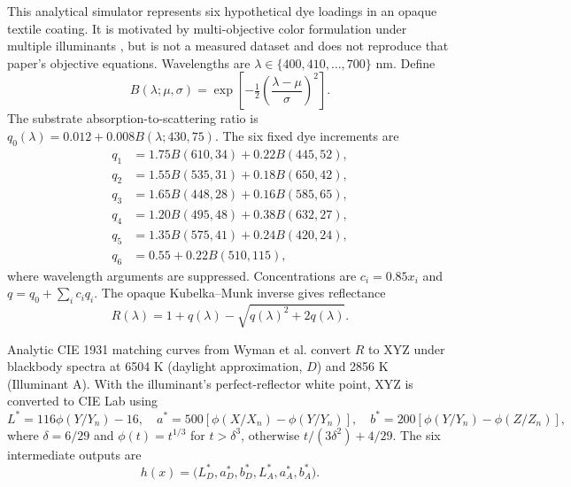 \documentclass{article}
\begin{document}
This analytical simulator represents six hypothetical dye loadings in an
opaque textile coating.  It is motivated by multi-objective color formulation
under multiple illuminants \cite{chaoucha2022color}, but is not a measured
dataset and does not reproduce that paper's objective equations.  Wavelengths
are $\lambda\in\{400,410,\ldots,700\}$ nm.  Define
\begin{equation}
 B(\lambda;\mu,\sigma)=
 \exp\!\left[-\tfrac12\left(\frac{\lambda-\mu}{\sigma}\right)^2\right].
\end{equation}
The substrate absorption-to-scattering ratio is
$q_0(\lambda)=0.012+0.008B(\lambda;430,75)$.  The six fixed dye increments are
\begin{equation}
\begin{aligned}
q_1 &= 1.75B(610,34)+0.22B(445,52),\\
q_2 &= 1.55B(535,31)+0.18B(650,42),\\
q_3 &= 1.65B(448,28)+0.16B(585,65),\\
q_4 &= 1.20B(495,48)+0.38B(632,27),\\
q_5 &= 1.35B(575,41)+0.24B(420,24),\\
q_6 &= 0.55+0.22B(510,115),
\end{aligned}
\end{equation}
where wavelength arguments are suppressed.  Concentrations are
$c_i=0.85x_i$ and $q=q_0+\sum_i c_iq_i$.  The opaque Kubelka--Munk inverse
\cite{kubelka1931optik} gives reflectance
\begin{equation}
  R(\lambda)=1+q(\lambda)-\sqrt{q(\lambda)^2+2q(\lambda)}.
  \label{eq:km}
\end{equation}

Analytic CIE 1931 matching curves from Wyman et al.
\cite{wyman2013simple} convert $R$ to XYZ under blackbody spectra at 6504 K
(daylight approximation, $D$) and 2856 K (Illuminant A).  With the illuminant's
perfect-reflector white point, XYZ is converted to CIE Lab using
\begin{equation}
 L^*=116\phi(Y/Y_n)-16,\quad
 a^*=500[\phi(X/X_n)-\phi(Y/Y_n)],\quad
 b^*=200[\phi(Y/Y_n)-\phi(Z/Z_n)],
\end{equation}
where $\delta=6/29$ and
$\phi(t)=t^{1/3}$ for $t>\delta^3$, otherwise
$t/(3\delta^2)+4/29$.  The six intermediate outputs are
\begin{equation}
 h(x)=\big(L_D^*,a_D^*,b_D^*,L_A^*,a_A^*,b_A^*\big).
\end{equation}
\end{document}
